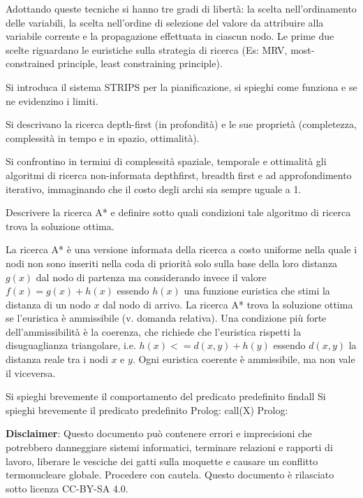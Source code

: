 \documentclass[answers, a4paper, 11pt]{exam}
\begin{document}
\begin{questions}
\begin{solution}
Adottando queste tecniche si hanno tre gradi di libertà: la scelta nell'ordinamento delle variabili, la scelta nell'ordine di selezione del valore da attribuire alla variabile corrente e la propagazione effettuata in ciascun nodo. Le prime due scelte riguardano le euristiche sulla strategia di ricerca (Es: MRV, most-constrained principle, least constraining principle).


\end{solution}

\question Si introduca il sistema STRIPS per la pianificazione, si spieghi come funziona e se ne evidenzino i limiti.

\question Si descrivano la ricerca depth-first (in profondità) e le sue proprietà (completezza, complessità in tempo e in spazio, ottimalità).

\question Si confrontino in termini di complessità spaziale, temporale e ottimalità gli algoritmi di ricerca non-informata depthfirst, breadth first e ad approfondimento iterativo, immaginando che il costo degli archi sia sempre uguale a 1.


\question Descrivere la ricerca A* e definire sotto quali condizioni tale algoritmo di ricerca trova la soluzione ottima.
\begin{solution}
  La ricerca A* è una versione informata della ricerca a costo uniforme nella quale i nodi non sono inseriti nella coda di priorità solo sulla base della loro distanza $g(x)$ dal nodo di partenza ma considerando invece il valore $f(x) = g(x) + h(x)$ essendo $h(x)$ una funzione euristica che stimi la distanza di un nodo $x$ dal nodo di arrivo. 
  La ricerca A* trova la soluzione ottima se l'euristica è ammissibile (v. domanda relativa). 
  Una condizione più forte dell'ammissibilità è la coerenza, che richiede che l'euristica rispetti la disuguaglianza triangolare, i.e. $h(x) <= d(x, y) + h(y)$ essendo $d(x, y)$ la distanza reale tra i nodi $x$ e $y$. 
  Ogni euristica coerente è ammissibile, ma non vale il viceversa. 
\end{solution}

\question 
Si spieghi brevemente il comportamento del predicato predefinito findall
\question 
Si spieghi brevemente il predicato predefinito Prolog: call(X) 
Prolog:

\end{questions}


\textbf{Disclaimer}:  Questo documento può contenere errori e imprecisioni che potrebbero danneggiare sistemi informatici, terminare relazioni e rapporti di lavoro, liberare le vesciche dei gatti sulla moquette e causare un conflitto termonucleare globale.
Procedere con cautela.
Questo documento è rilasciato sotto licenza CC-BY-SA 4.0. \ccbysa
\end{document}

